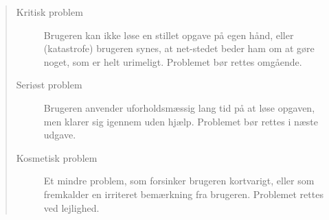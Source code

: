 \begin{quotation}
\begin{description}
\item[Kritisk problem] Brugeren kan ikke løse en stillet opgave på egen hånd, eller
(katastrofe) brugeren synes, at net-stedet beder ham om at gøre noget, som er helt
urimeligt. Problemet bør rettes omgående.
\item[Seriøst problem] Brugeren anvender uforholdsmæssig lang tid på at løse opgaven, men
klarer sig igennem uden hjælp. Problemet bør rettes i næste udgave.
\item[Kosmetisk problem] Et mindre problem, som forsinker brugeren kortvarigt, eller som fremkalder en irriteret bemærkning fra brugeren. Problemet rettes ved
lejlighed.\cite{usabilitykat}
\end{description}
\end{quotation}

